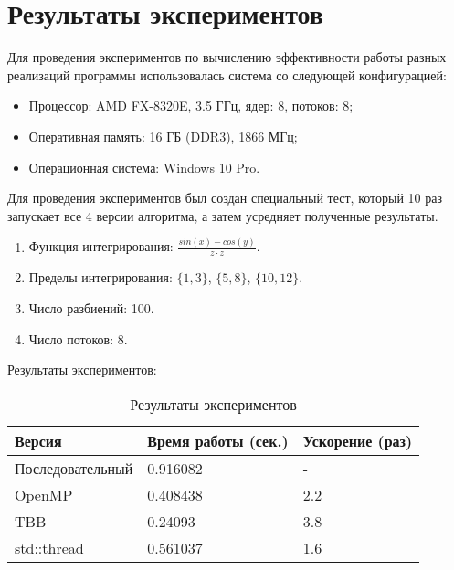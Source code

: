 \documentclass{report}
\begin{document}
\section*{Результаты экспериментов}
Для проведения экспериментов по вычислению эффективности работы разных реализаций программы использовалась система со следующей конфигурацией:
\begin{itemize}
\item Процессор: AMD FX-8320E, 3.5 ГГц, ядер: 8, потоков: 8;
\item Оперативная память: 16 ГБ (DDR3), 1866 МГц;
\item Операционная система: Windows 10 Pro.
\end{itemize}

\par Для проведения экспериментов был создан специальный тест, который 10 раз запускает все 4 версии алгоритма, а затем усредняет полученные результаты.  
\begin{enumerate}
    \item Функция интегрирования: $\frac{sin(x) - cos(y)}{z \cdot z}$.
    \item Пределы интегрирования: $\{1, 3\}$, $\{5, 8\}$, $\{10, 12\}$.
    \item Число разбиений: 100.
    \item Число потоков: 8.
\end{enumerate}

\par Результаты экспериментов:
\begin{table}[!h]
\centering
\begin{tabular}{| X | X | X |}
\hline
Версия & Время работы (сек.) & Ускорение (раз) \\
\hline
Последовательный        & 0.916082        & -         \\
OpenMP        & 0.408438        & 2.2          \\
TBB       & 0.24093        & 3.8         \\
std::thread        & 0.561037        & 1.6           \\
\hline
\end{tabular}
\caption{Результаты экспериментов}
\end{table}

\newpage

\end{document}
